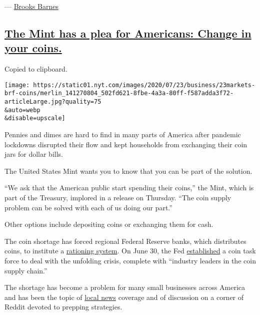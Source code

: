 --- \href{https://www.nytimes.com/by/brooks-barnes}{Brooks Barnes}

\hypertarget{the-mint-has-a-plea-for-americans-change-in-your-coins}{%
\subsection{\texorpdfstring{\protect\hyperlink{coin-shortage-united-states-mint}{The
Mint has a plea for Americans: Change in your
coins.}}{The Mint has a plea for Americans: Change in your coins.}}\label{the-mint-has-a-plea-for-americans-change-in-your-coins}}

Copied to clipboard.

\texttt{[image: https://static01.nyt.com/images/2020/07/23/business/23markets-brf-coins/merlin\_141270804\_502fd621-8fbe-4a3a-80ff-f587adda3f72-articleLarge.jpg?quality=75\\\&auto=webp\\\&disable=upscale]}

Pennies and dimes are hard to find in many parts of America after
pandemic lockdowns disrupted their flow and kept households from
exchanging their coin jars for dollar bills.

The United States Mint wants you to know that you can be part of the
solution.

``We ask that the American public start spending their coins,'' the
Mint, which is part of the Treasury, implored in a release on Thursday.
``The coin supply problem can be solved with each of us doing our
part.''

Other options include depositing coins or exchanging them for cash.

The coin shortage has forced regional Federal Reserve banks, which
distributes coins, to institute a
\href{https://www.nytimes.com/2020/06/25/business/economy/coin-shortage-coronavirus.html}{rationing
system}. On June 30, the Fed
\href{https://www.frbservices.org/news/communications/071020-us-coin-task-force-members-confirmed.html?utm_source=home-071020\&utm_medium=banner\&utm_campaign=fedcash\&utm_content=3-coin-task-force}{established}
a coin task force to deal with the unfolding crisis, complete with
``industry leaders in the coin supply chain.''

The shortage has become a problem for many small businesses across
America and has been the topic of
\href{https://www.wataugademocrat.com/covid19/widespread-coin-shortages-a-symptom-of-pandemic/article_806c11c9-9b52-5ace-890a-dc250e8316cc.html}{local
news} coverage and of discussion on a corner of Reddit devoted to
prepping strategies.

